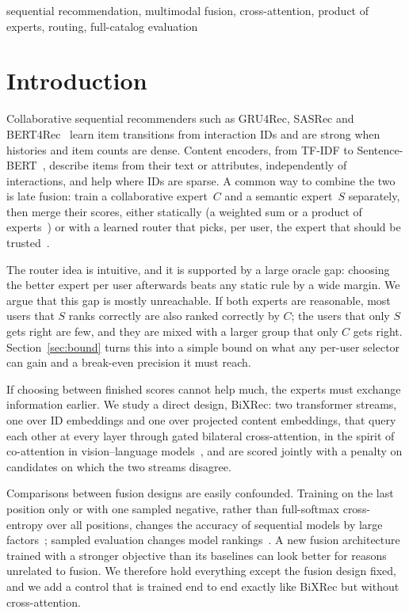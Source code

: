 \documentclass[conference]{IEEEtran}
\begin{document}
\begin{IEEEkeywords}
sequential recommendation, multimodal fusion, cross-attention, product of experts, routing, full-catalog evaluation
\end{IEEEkeywords}

\section{Introduction}

Collaborative sequential recommenders such as GRU4Rec, SASRec and BERT4Rec~\cite{hidasi2016gru4rec,kang2018sasrec,%
sun2019bert4rec} learn item transitions from interaction IDs and are strong when histories and item counts are
dense. Content encoders, from TF-IDF to Sentence-BERT~\cite{reimers2019sbert}, describe items from their text or
attributes, independently of interactions, and help where IDs are sparse. A common way to combine the two is late fusion: train a collaborative expert~$C$ and a
semantic expert~$S$ separately, then merge their scores, either statically (a weighted sum or a product of
experts~\cite{hinton2002poe}) or with a learned router that picks, per user, the expert that should be
trusted~\cite{shazeer2017moe,ma2018mmoe}.

The router idea is intuitive, and it is supported by a large oracle gap: choosing the better expert per user
afterwards beats any static rule by a wide margin. We argue that this gap is mostly unreachable. If both experts are
reasonable, most users that $S$ ranks correctly are also ranked correctly by $C$; the users that only $S$ gets right
are few, and they are mixed with a larger group that only $C$ gets right. Section~\ref{sec:bound} turns this into a
simple bound on what any per-user selector can gain and a break-even precision it must reach.

If choosing between finished scores cannot help much, the experts must exchange information earlier. We study a
direct design, BiXRec: two transformer streams, one over ID embeddings and one over projected content embeddings, that
query each other at every layer through gated bilateral cross-attention, in the spirit of co-attention in
vision--language models~\cite{lu2019vilbert}, and are scored jointly with a penalty on candidates on which the two
streams disagree.

Comparisons between fusion designs are easily confounded. Training on the last position only or with one sampled
negative, rather than full-softmax cross-entropy over all positions, changes the accuracy of sequential models by
large factors~\cite{klenitskiy2023dross,petrov2023gsasrec}; sampled evaluation changes model
rankings~\cite{krichene2020sampled,dallmann2021sampling}. A new fusion architecture trained with a stronger
objective than its baselines can look better for reasons unrelated to fusion. We therefore hold everything except
the fusion design fixed, and we add a control that is trained end to end exactly like BiXRec but without
cross-attention.
\end{document}
